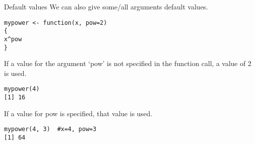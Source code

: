\documentclass{beamer}
\begin{document}
\begin{frame}[fragile]{Default values}
We can also give some/all arguments default values.
\begin{verbatim}
mypower <- function(x, pow=2)
{
x^pow
}
\end{verbatim}
If a value for the argument `pow' is not specified in the function call,
a value of 2 is used.
\begin{verbatim}
mypower(4)
[1] 16
\end{verbatim}
If a value for pow is specified, that value is used.
\begin{verbatim}
mypower(4, 3)  #x=4, pow=3
[1] 64
\end{verbatim}
\end{frame}
\end{document}
